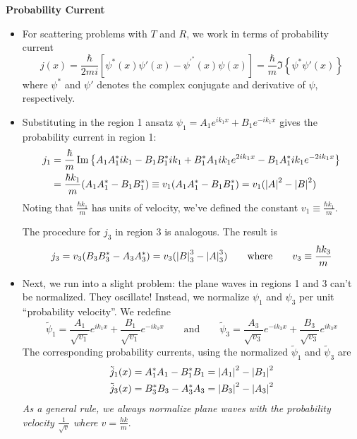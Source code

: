 \documentclass[11pt, a4paper]{article}
\newcommand{\eqtext}[1]{\qquad \text{#1} \qquad}
\begin{document}
\textbf{Probability Current} 
\begin{itemize}

	\item For scattering problems with $ T $ and $ R $, we work in terms of probability current
	\begin{equation*}
		j(x) = \frac{\hbar}{2mi}\left[\psi^{*}(x)\psi'(x) - \psi^{'^{*}}(x)\psi(x)\right] = \frac{\hbar}{m} \Im \left\{\psi^{*}\psi'(x)\right\}
	\end{equation*}
	where $ \psi^{*} $ and $ \psi' $ denotes the complex conjugate and derivative of $ \psi $, respectively.
	
	\item Substituting in the region 1 ansatz $ \psi_{1} = A_{1} e^{ik_{1}x} + B_{1}e^{-ik_{1}x}  $  gives the probability current in region 1:
	\begin{align*}
		j_{1} &= \frac{\hbar}{m}\Im \left\{A_{1}A_{1}^{*}ik_{1} - B_{1}B_{1}^{*}ik_{1} + B_{1}^{*}A_{1}ik_{1}e^{2ik_{1}x} - B_{1}A_{1}^{*}ik_{1}e^{-2ik_{1}x}\right\}\\
		&=\frac{\hbar k_{1}}{m}(A_{1}A_{1}^{*} - B_{1}B_{1}^{*}) \equiv v_{1}(A_{1}A_{1}^{*} - B_{1}B_{1}^{*}) =  v_{1}(\abs{A}^{2} - \abs{B}^{2})
	\end{align*}
	Noting that $ \frac{\hbar k_{1}}{m} $ has units of velocity, we've defined the constant $ v_{1} \equiv \frac{\hbar k_{1}}{m} $. 
	
	The procedure for $ j_{3} $ in region 3 is analogous. The result is
	\begin{equation*}
		j_{3} = v_{3}(B_{3}B_{3}^{*} - A_{3}A_{3}^{*}) = v_{3}(\abs{B}_{3}^{3} - \abs{A}_{3}^{3}) \eqtext{where} v_{3} \equiv \frac{\hbar k_{3}}{m}
	\end{equation*}

	
	\item Next, we run into a slight problem: the plane waves in regions 1 and 3 can't be normalized. They oscillate! Instead, we normalize $ \psi_{1} $ and $ \psi_{3} $ per unit ``probability velocity''. We redefine 
	\begin{equation*}
		\tilde{\psi}_{1} = \frac{A_{1}}{\sqrt{v_{1}}} e^{ik_{1}x} + \frac{B_{1}}{\sqrt{v_{1}}}e^{-ik_{1}x} \eqtext{and} \tilde{\psi}_{3} = \frac{A_{3}}{\sqrt{v_{3}}} e^{-ik_{3}x} + \frac{B_{3}}{\sqrt{v_{3}}}e^{ik_{3}x}
	\end{equation*}
	The corresponding probability currents, using the normalized $ \tilde{\psi}_{1} $ and $ \tilde{\psi}_{3} $ are
	\begin{align*}
		&\tilde{j}_{1}(x) = A_{1}^{*}A_{1} - B_{1}^{*}B_{1} = \abs{A_{1}}^{2} - \abs{B_{1}}^{2}\\
		&\tilde{j}_{3}(x) = B_{3}^{*}B_{3} - A_{3}^{*}A_{3} = \abs{B_{3}}^{2} - \abs{A_{3}}^{2}
	\end{align*}
	\textit{As a general rule, we always normalize plane waves with the probability velocity $ \frac{1}{\sqrt{v}} $ where $ v = \frac{hk}{m} $}.
	

\end{itemize}
\end{document}
